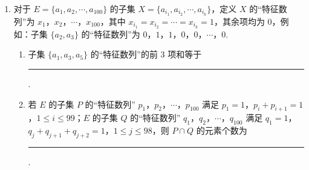 \begin{description}
\begin{enumerate}[leftmargin=5pt]
        \item 对于 \(E = \{a_1, a_2, \cdots, a_{100}\}\) 的子集 \(X = \{a_{i_1}, a_{i_2}, \cdots, a_{i_k}\}\)，定义 \(X\) 的“特征数列”为 \(x_1\)，\(x_2\)，\(\cdots\)，\(x_{100}\)，其中 \(x_{i_1} = x_{i_2} = \cdots = x_{i_k} = 1\)，其余项均为 \(0\)，例如：子集 \(\{a_2, a_3\}\) 的“特征数列”为 \(0\)，\(1\)，\(1\)，\(0\)，\(0\)，\(\cdots\)，\(0\).
\begin{enumerate}
\item 子集 \( \{a_{1}, a_{3}, a_{5}\} \) 的“特征数列”的前 3 项和等于\rule[-0.3ex]{3em}{0.4pt}.
\item 若 \(E\) 的子集 \(P\) 的“特征数列” \(p_{1}\)，\(p_{2}\)，\(\cdots\)，\(p_{100}\) 满足 \(p_{1}=1\)，\(p_{i}+p_{i+1}=1\)，\(1\leqslant i\leqslant99\)；\(E\) 的子集 \(Q\) 的“特征数列” \(q_{1}\)，\(q_{2}\)，\(\cdots\)，\(q_{100}\) 满足 \(q_{1}=1\)，\(q_{j}+q_{j+1}+q_{j+2}=1\)，\(1\leqslant j\leqslant98\)，则 \(P\cap Q\) 的元素个数为\rule[-0.3ex]{3em}{0.4pt}.
\end{enumerate}

    \end{enumerate}

\end{description}


